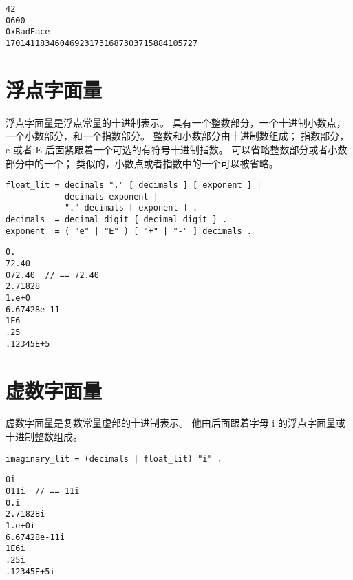 \begin{lstlisting}[style=golang]
42
0600
0xBadFace
170141183460469231731687303715884105727
\end{lstlisting}


\section{浮点字面量}
浮点字面量是浮点常量的十进制表示。
具有一个整数部分，一个十进制小数点，一个小数部分，和一个指数部分。
整数和小数部分由十进制数组成；
指数部分， e 或者 E 后面紧跟着一个可选的有符号十进制指数。
可以省略整数部分或者小数部分中的一个；
类似的，小数点或者指数中的一个可以被省略。
\begin{lstlisting}[style=golang]
float_lit = decimals "." [ decimals ] [ exponent ] |
            decimals exponent |
            "." decimals [ exponent ] .
decimals  = decimal_digit { decimal_digit } .
exponent  = ( "e" | "E" ) [ "+" | "-" ] decimals .
\end{lstlisting}

\begin{lstlisting}[style=golang]
0.
72.40
072.40  // == 72.40
2.71828
1.e+0
6.67428e-11
1E6
.25
.12345E+5
\end{lstlisting}

\section{虚数字面量}
虚数字面量是复数常量虚部的十进制表示。
他由后面跟着字母 i 的浮点字面量或十进制整数组成。
\begin{lstlisting}[style=EBNF]
imaginary_lit = (decimals | float_lit) "i" .
\end{lstlisting}

\begin{lstlisting}[style=golang]
0i
011i  // == 11i
0.i
2.71828i
1.e+0i
6.67428e-11i
1E6i
.25i
.12345E+5i
\end{lstlisting}


